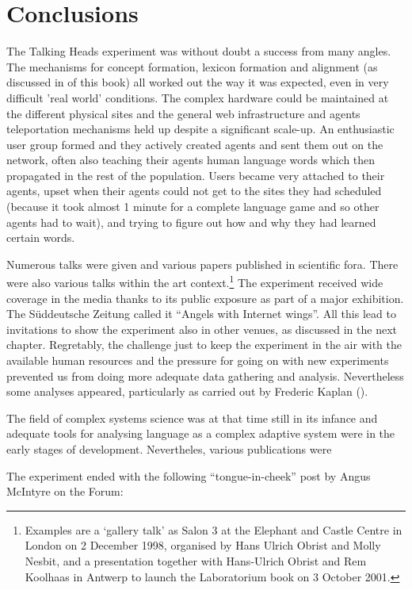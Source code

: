 \section{Conclusions} 

The Talking Heads experiment was without doubt a success from many angles. The mechanisms for concept formation,
lexicon formation and alignment (as discussed in  of this book) all worked out the 
way it was expected, even in very difficult 'real world' conditions. The complex hardware could be maintained at the 
different physical sites and the general web infrastructure and agents teleportation mechanisms held up despite a 
significant scale-up. An enthusiastic user group formed and they actively created agents and sent 
them out on the network, often also teaching their agents human language words which then propagated
in the rest of the population. Users became very attached to their agents, upset when their agents could not get 
to the sites they had scheduled (because it took almost 1 minute for a complete language game and so other agents 
had to wait), and trying to figure out how and why they had learned certain words. 

Numerous talks were given and various papers published in scientific fora. There were also various talks within 
the art context.\footnote{Examples are a `gallery talk' as Salon 3 at the Elephant and Castle Centre
in London on 2 December 1998, organised by Hans Ulrich Obrist and Molly Nesbit, and a presentation together with 
Hans-Ulrich Obrist and Rem Koolhaas in Antwerp to launch the Laboratorium book on 3 October 2001.}
The experiment received wide coverage in 
the media thanks to its public exposure as part of a major exhibition. The Süddeutsche Zeitung called it 
``Angels with Internet wings''. All this lead to invitations to show the experiment
also in other venues, as discussed in the next chapter. 
Regretably, the challenge just to keep the experiment in the air with the available human resources
and the pressure for going on with new experiments prevented us from doing more adequate data gathering 
and analysis. Nevertheless some analyses appeared, particularly as carried out by Frederic Kaplan (\citealt{Kaplan:2001}). 

The field of complex systems science was at that time still in its infance and 
adequate tools for analysing language as a complex adaptive system were in the early stages of development. 
Nevertheles, various publications were 

The experiment ended with the following ``tongue-in-cheek'' post by Angus McIntyre on the Forum:

